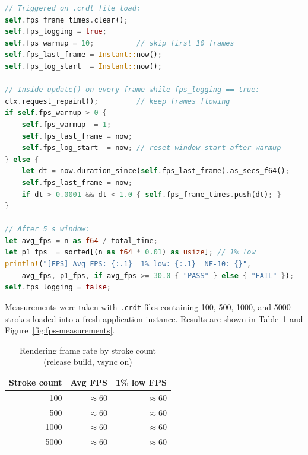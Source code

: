 \documentclass[a4paper,11pt,twoside]{report}
\theoremstyle{definition}
\begin{document}
\begin{lstlisting}[language=Rust]
// Triggered on .crdt file load:
self.fps_frame_times.clear();
self.fps_logging = true;
self.fps_warmup = 10;          // skip first 10 frames
self.fps_last_frame = Instant::now();
self.fps_log_start  = Instant::now();

// Inside update() on every frame while fps_logging == true:
ctx.request_repaint();         // keep frames flowing
if self.fps_warmup > 0 {
    self.fps_warmup -= 1;
    self.fps_last_frame = now;
    self.fps_log_start  = now; // reset window start after warmup
} else {
    let dt = now.duration_since(self.fps_last_frame).as_secs_f64();
    self.fps_last_frame = now;
    if dt > 0.0001 && dt < 1.0 { self.fps_frame_times.push(dt); }
}

// After 5 s window:
let avg_fps = n as f64 / total_time;
let p1_fps  = sorted[(n as f64 * 0.01) as usize]; // 1% low
println!("[FPS] Avg FPS: {:.1}  1% low: {:.1}  NF-10: {}",
    avg_fps, p1_fps, if avg_fps >= 30.0 { "PASS" } else { "FAIL" });
self.fps_logging = false;
\end{lstlisting}

Measurements were taken with \texttt{.crdt} files containing 100, 500, 1000, and 5000
strokes loaded into a fresh application instance. Results are shown in Table~\ref{tab:fps}
and Figure~\ref{fig:fps-measurements}.

\begin{table}[H]
    \centering
    \caption{Rendering frame rate by stroke count (release build, vsync on)}
    \begin{tabular}{|r|r|r|}
        \hline
        \textbf{Stroke count} & \textbf{Avg FPS} & \textbf{1\% low FPS} \\
        \hline
        100  & $\approx$60 & $\approx$60 \\
        \hline
        500  & $\approx$60 & $\approx$60 \\
        \hline
        1000 & $\approx$60 & $\approx$60 \\
        \hline
        5000 & $\approx$60 & $\approx$60 \\
        \hline
    \end{tabular}
    \label{tab:fps}
\end{table}
\end{document}
